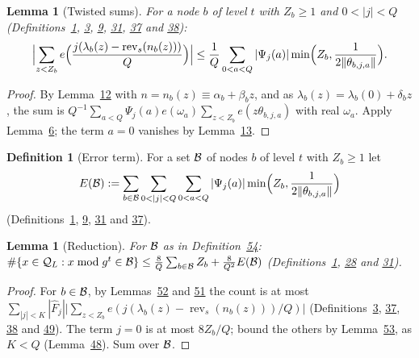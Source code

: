 \documentclass[11pt]{article}
\newcounter{hffc}
\theoremstyle{definition}\newtheorem{hffdef}[hffc]{Definition}
\theoremstyle{plain}\newtheorem{hfflem}[hffc]{Lemma}\newtheorem{hffthm}[hffc]{Theorem}
\theoremstyle{remark}\newtheorem{hffrem}[hffc]{Remark}
\newcommand{\hffcost}{}
\newcommand{\setcost}[1]{\renewcommand{\hffcost}{#1}}
\newcommand{\rev}{\operatorname{rev}}
\begin{document}
\begin{hfflem}[Twisted sums]\label{L:twisted}
For a node $b$ of level $t$ with $Z_b\ge1$ and $0<|j|<Q$ (Definitions~\hyperref[D:conv]{1}, \hyperref[D:digits]{3}, \hyperref[D:psi]{9}, \hyperref[D:node]{31}, \hyperref[D:phase]{37} and \hyperref[D:arch]{38}): \[\Bigl|\sum_{z<Z_b}e\Bigl(\frac{j(\lambda_b(z)-\rev_s(n_b(z)))}Q\Bigr)\Bigr|\le \frac1Q\sum_{0<a<Q}|\Psi_j(a)|\min\Bigl(Z_b,\frac1{2\|\theta_{b,j,a}\|}\Bigr).\]
\par\nopagebreak{}
\end{hfflem}
\begin{proof}\setcost{length 138/300}By Lemma~\hyperref[L:fourier]{12} with $n=n_b(z)\equiv\alpha_b+\beta_bz$, and as $\lambda_b(z)=\lambda_b(0)+\delta_bz$, the sum is $Q^{-1}\sum_{a<Q}\Psi_j(a)e(\omega_a)\sum_{z<Z_b}e(z\theta_{b,j,a})$ with real $\omega_a$. Apply Lemma~\hyperref[L:geom]{6}; the term $a=0$ vanishes by Lemma~\hyperref[L:zero]{13}.
\end{proof}

\begin{hffdef}[Error term]\label{D:err}
For a set $\mathcal{B}$ of nodes $b$ of level $t$ with $Z_b\ge1$ let \[E(\cB):=\sum_{b\in\cB}\sum_{0<|j|<Q}\sum_{0<a<Q}|\Psi_j(a)|\min\Bigl(Z_b,\frac1{2\|\theta_{b,j,a}\|}\Bigr)\] (Definitions~\hyperref[D:conv]{1}, \hyperref[D:psi]{9}, \hyperref[D:node]{31} and \hyperref[D:phase]{37}).
\par\nopagebreak{}
\end{hffdef}

\begin{hfflem}[Reduction]\label{L:red}
For $\mathcal{B}$ as in Definition~\hyperref[D:err]{54}: $\#\{x\in\mathcal{Q}_L:x\bmod g^t\in\mathcal{B}\}\le\frac8Q\sum_{b\in\mathcal{B}}Z_b+\frac8{Q^2}E(\mathcal{B})$ (Definitions~\hyperref[D:conv]{1}, \hyperref[D:pal]{28} and \hyperref[D:node]{31}).
\par\nopagebreak{}
\end{hfflem}
\begin{proof}\setcost{length 175/300}For $b\in\mathcal{B}$, by Lemmas~\hyperref[L:innode]{52} and \hyperref[L:majcoef]{51} the count is at most $\sum_{|j|<K}|\hat F_j|\bigl|\sum_{z<Z_b}e(j(\lambda_b(z)-\rev_s(n_b(z)))/Q)\bigr|$ (Definitions~\hyperref[D:digits]{3}, \hyperref[D:phase]{37}, \hyperref[D:arch]{38} and \hyperref[D:maj]{49}). The term $j=0$ is at most $8Z_b/Q$; bound the others by Lemma~\hyperref[L:twisted]{53}, as $K<Q$ (Lemma~\hyperref[L:K]{48}). Sum over $\mathcal{B}$.
\end{proof}
\end{document}
